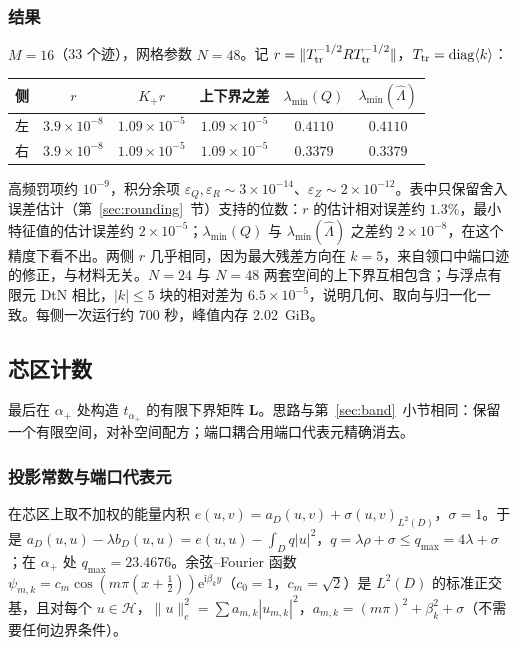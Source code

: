 \documentclass[11pt,a4paper,fontset=fandol]{ctexart}
\newcommand{\ii}{\mathrm{i}}
\newcommand{\ee}{\mathrm{e}}
\theoremstyle{plain}
\theoremstyle{definition}
\theoremstyle{remark}
\begin{document}
\subsubsection{结果}

$M=16$（33 个迹），网格参数 $N=48$。记 $r=\|T_{\rm tr}^{-1/2}RT_{\rm tr}^{-1/2}\|$，$T_{\rm tr}=\operatorname{diag}\langle k\rangle$：
\begin{center}
\small
\begin{tabular}{lccccc}
\toprule
侧 & $r$ & $K_+r$ & 上下界之差 & $\lambda_{\min}(Q)$ & $\lambda_{\min}(\hat\Lambda)$ \\
\midrule
左 & $3.9\times10^{-8}$ & $1.09\times10^{-5}$ & $1.09\times10^{-5}$ & $0.4110$ & $0.4110$ \\
右 & $3.9\times10^{-8}$ & $1.09\times10^{-5}$ & $1.09\times10^{-5}$ & $0.3379$ & $0.3379$ \\
\bottomrule
\end{tabular}
\end{center}
高频罚项约 $10^{-9}$，积分余项 $\varepsilon_Q,\varepsilon_R\sim3\times10^{-14}$、$\varepsilon_Z\sim2\times10^{-12}$。表中只保留舍入误差估计（第~\ref{sec:rounding}~节）支持的位数：$r$ 的估计相对误差约 $1.3\%$，最小特征值的估计误差约 $2\times10^{-5}$；$\lambda_{\min}(Q)$ 与 $\lambda_{\min}(\hat\Lambda)$ 之差约 $2\times10^{-8}$，在这个精度下看不出。两侧 $r$ 几乎相同，因为最大残差方向在 $k=5$，来自领口中端口迹的修正，与材料无关。$N=24$ 与 $N=48$ 两套空间的上下界互相包含；与浮点有限元 DtN 相比，$|k|\le5$ 块的相对差为 $6.5\times10^{-5}$，说明几何、取向与归一化一致。每侧一次运行约 700 秒，峰值内存 2.02~GiB。

\subsection{芯区计数}
\label{sec:count}
最后在 $\alpha_+$ 处构造 $t_{\alpha_+}$ 的有限下界矩阵 $\bm L$。思路与第~\ref{sec:band}~小节相同：保留一个有限空间，对补空间配方；端口耦合用端口代表元精确消去。

\subsubsection{投影常数与端口代表元}

在芯区上取不加权的能量内积 $e(u,v)=a_D(u,v)+\sigma(u,v)_{L^2(D)}$，$\sigma=1$。于是 $a_D(u,u)-\lambda b_D(u,u)=e(u,u)-\int_Dq|u|^2$，$q=\lambda\rho+\sigma\le q_{\max}=4\lambda+\sigma$；在 $\alpha_+$ 处 $q_{\max}=23.4676$。余弦--Fourier 函数 $\psi_{m,k}=c_m\cos(m\pi(x+\frac12))\ee^{\ii\beta_ky}$（$c_0=1$，$c_m=\sqrt2$）是 $L^2(D)$ 的标准正交基，且对每个 $u\in\mathcal H$，$\|u\|_e^2=\sum a_{m,k}|u_{m,k}|^2$，$a_{m,k}=(m\pi)^2+\beta_k^2+\sigma$（不需要任何边界条件）。
\end{document}
